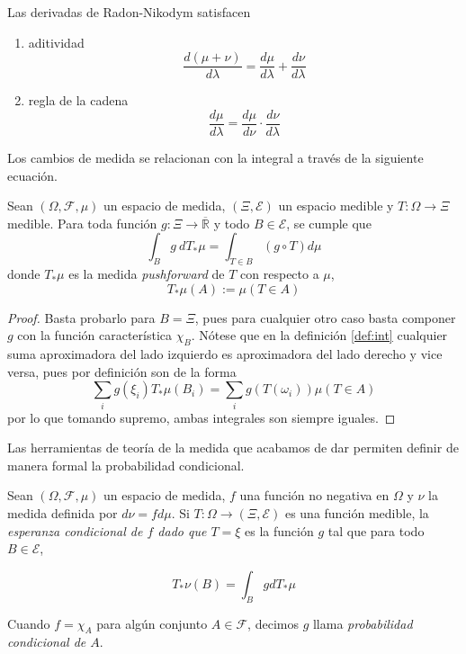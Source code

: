 \documentclass[main.tex]{subfiles}
\begin{document}
\begin{prop}\label{thm:props-rn}
Las derivadas de Radon-Nikodym satisfacen
\begin{enumerate}[label=\roman*.]
	\item aditividad
		\begin{equation*}
			\frac{d(\mu+\nu)}{d\lambda} = \frac{d\mu}{d\lambda}+\frac{d\nu}{d\lambda}
		\end{equation*}
	\item regla de la cadena
		\begin{equation*}
			\frac{d\mu}{d\lambda} = \frac{d\mu}{d\nu}\cdot\frac{d\nu}{d\lambda}
		\end{equation*}
\end{enumerate}
\end{prop}


Los cambios de medida se relacionan con la integral a través de la siguiente ecuación.

\begin{lemma}\label{lemma:trans-int}
	Sean $(\Omega, \mathcal{F}, \mu)$ un espacio de medida, $(\Xi, \mathcal{E})$ un espacio medible y $T:\Omega \to \Xi$ medible. Para toda función $g:\Xi \to \overline{\mathbb{R}}$ y todo $B\in\mathcal{E}$, se cumple que
	\begin{equation*}
		\int _Bg\ dT_*\mu=\int_{T\in B}(g\circ T)d\mu
	\end{equation*} 
	donde $T_*\mu$ es la medida \textit{pushforward} de $T$ con respecto a $\mu$,  
	\begin{equation*}
		T_*\mu(A):=\mu(T\in A)
	\end{equation*}
\end{lemma}
\begin{proof}
Basta probarlo para $B=\Xi$, pues para cualquier otro caso basta componer $g$ con la función característica $\chi_B$. Nótese que en la definición \ref{def:int} cualquier suma aproximadora del lado izquierdo es aproximadora del lado derecho y vice versa, pues por definición son de la forma
\begin{equation*}
	\sum_i g(\xi_i)T_*\mu(B_i) = \sum_i g\left(T(\omega_i)\right)\mu(T \in A)
\end{equation*}
por lo que tomando supremo, ambas integrales son siempre iguales.
\end{proof}

Las herramientas de teoría de la medida que acabamos de dar permiten definir de manera formal la probabilidad condicional.

\begin{definition}
Sean $(\Omega, \mathcal{F}, \mu)$ un espacio de medida, $f$ una función no negativa en $\Omega$  y $\nu$ la medida definida por $d\nu = fd\mu$. Si $T:\Omega \to (\Xi, \mathcal{E})$ es una función medible, la  \textit{esperanza condicional de $f$ dado que $T=\xi$} es la función $g$ tal que para todo $B\in\mathcal{E}$,

\begin{equation*}
	T_*\nu(B) = \int_B gdT_*\mu
\end{equation*}

Cuando $f=\chi_A$ para algún conjunto $A\in\mathcal{F}$, decimos $g$ llama \textit{probabilidad condicional de $A$}.
\end{definition}
\end{document}
